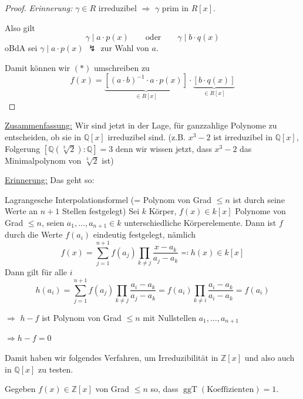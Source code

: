 \documentclass[a4paper,12pt,numbers=noenddot,parskip=full]{scrartcl}
\newcommand{\setZ}{\mathbb{Z}}
\newcommand{\setQ}{\mathbb{Q}}
\newcommand{\heading}{\underline}
\theoremstyle{dotless}
\theoremstyle{remark}
\begin{document}
\begin{proof}
		\textit{Erinnerung:} $\gamma \in R$ irreduzibel $\Rightarrow$ $\gamma$ prim in $R[x]$.
		
		Also gilt
		\begin{equation*}
			\gamma \mid a \cdot p(x) \qquad\text{oder}\qquad \gamma \mid b \cdot q(x)
		\end{equation*}
		oBdA sei $\gamma \mid a \cdot p(x)$ $\lightning$ zur Wahl von $a$.
		
		Damit können wir $(*)$ umschreiben zu
		\begin{equation*}
			f(x) = \underbrace{\left[ (a \cdot b)^{-1} \cdot a \cdot p(x) \right]}_{\in R[x]} \cdot \underbrace{\left[ b \cdot q(x) \right]}_{\in R[x]}
		\end{equation*}
	\end{proof}

	\heading{Zusammenfassung:} Wir sind jetzt in der Lage, für ganzzahlige Polynome zu entscheiden, ob sie in $\setQ[x]$ irreduzibel sind. (z.B. $x^3 - 2$ ist irreduzibel in $\setQ[x]$, Folgerung $[\setQ(\sqrt[3]{2}): \setQ] = 3$ denn wir wissen jetzt, dass $x^3 - 2$ das Minimalpolynom von $\sqrt[3]{2}$ ist)
	
	\heading{Erinnerung:} Das geht so:
	
	Lagrangesche Interpolationsformel (= Polynom von Grad $\leq n$ ist durch seine Werte an $n+1$ Stellen festgelegt) Sei $k$ Körper, $f(x) \in k[x]$ Polynome von Grad $\leq n$, seien $a_1, \dots, a_{n+1} \in k$ unterschiedliche Körperelemente. Dann ist $f$ durch die Werte $f(a_i)$ eindeutig festgelegt, nämlich
	\begin{equation*}
		f(x) = \sum_{j=1}^{n+1} f(a_j) \prod_{k \neq j} \frac{x - a_k}{a_j - a_k} \eqqcolon h(x) \in k[x]
	\end{equation*}
	Dann gilt für alle $i$
	\begin{equation*}
		h(a_i) = \sum_{j = 1}^{n+1} f(a_j) \prod_{k \neq j} \frac{a_i - a_k}{a_j - a_k} = f(a_i) \prod_{k \neq i} \frac{a_i - a_k}{a_i - a_k} = f(a_i)
	\end{equation*}
	
	$\Rightarrow$ $h-f$ ist Polynom von Grad $\leq n$ mit Nullstellen $a_1, \dots, a_{n+1}$
	
	$\Rightarrow h - f = 0$
	
	Damit haben wir folgendes Verfahren, um Irreduzibilität in $\setZ[x]$ und also auch in $\setQ[x]$ zu testen.
	
	Gegeben $f(x) \in \setZ[x]$ von Grad $\leq n$ so, dass $\operatorname{ggT}(\text{Koeffizienten}) = 1$.
	
\end{document}

